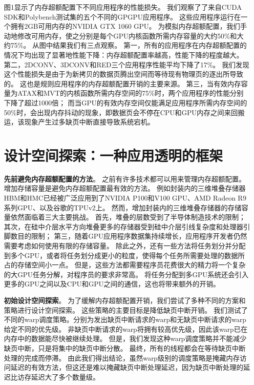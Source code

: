 图1显示了内存超额配置下不同应用程序的性能损失。
我们观察了了来自CUDA SDK和Polybench测试集的五个不同的GPGPU应用程序。
这些应用程序运行在一个拥有2GB可用内存的NVIDIA GTX 1060 GPU。
为模拟内存超额配置，我们手动地修改可用内存，使之分别是每个GPU内核函数所需内存容量的大约50\%和大约75\%。
从图中结果我们有三点观察。
第一，所有的应用程序在内存超额配置的情况下均出现了显著地性能下降：内存超额配置率越高，性能下降的程度越大。
第二，2DCONV、3DCONV和RED三个应用程序性能平均下降了17\%。
我们发现这个性能损失是由于为新拷贝的数据页腾出空间而等待现有物理页的逐出所导致的。
这也是规则应用程序的内存超额配置开销的主要来源。
第三，当有效内存容量为ATAX和MVT的内核函数所需内存空间的75\%时，两个应用程序的性能分别下降了超过1000倍；
而当GPU的有效内存空间仅能满足应用程序所需内存空间的50\%时，会出现内存抖动的现象，即数据页会不停在CPU和GPU内存之间来回搬运，该现象产生过多缺页中断直接导致系统宕机。


\section{设计空间探索：一种应用透明的框架}

\textbf{先前避免内存超额配置的方法}。
之前有许多技术都可以用来管理内存超额配置。
增加存储容量是避免内存超额配置最有效的方法。
例如封装内的三维堆叠存储器HBM和HMC已经被广泛应用到了NVIDIA P100和V100 GPU、AMD Radeon R9系列GPU、以及谷歌的TPUv2上。
然而，增加封装内的三维堆叠存储器的存储容量依然面临着三大主要挑战。
首先，堆叠的层数受到了半导体制造技术的限制；
其次，在硅中介层水平方向堆叠更多的存储器受到硅中介层引线复杂度和处理器引脚数目的限制；
第三，随着GPU应用程序数据集持续增长，应用程序开发者仍然需要考虑如何使用有限的存储容量。
除此之外，还有一些方法将任务划分并分配到多个GPU，或者将任务划分成更小的粒度，使得每个任务所需要处理的数据所占的存储空间小一点。
但是，这些方法都需要程序员花费很大的精力将一个复杂的大GPU任务分解，对程序员的要求非常高。
将任务分配到多GPU系统还会引入更多的GPU之间以及CPU和GPU之间的通信，这也将带来额外的开销。

\textbf{初始设计空间探索}。
为了缓解内存超额配置开销，我们尝试了多种不同的方案和策略进行设计空间探索。
这些策略的主要目标是降低缺页中断开销。
我们测试了不同的warp调度策略。分别为发出缺页中断请求的warp和无缺页中断请求的warp给定不同的优先级。
非缺页中断请求的warp将拥有较高优先级，因此该warp已在内存中的数据能尽快被继续处理。
但是，我们发现这种warp调度策略并不能减少缺页中断，只是将集中的缺页中断分散。
最终，所有的线程都会在等待缺页中断处理的完成而停滞。
由此我们得出结论，虽然warp级别的调度策略是掩藏内存访问延迟的有效方法，但这还是难以掩藏缺页中断处理延迟，因为缺页中断处理的延迟比访存延迟大了多个数量级。

